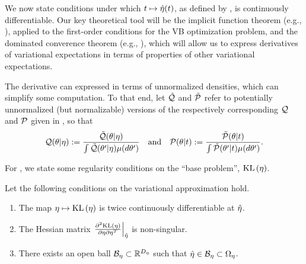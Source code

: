 We now state conditions under which $t \mapsto \hat\eta(t)$, as defined by
, is continuously differentiable.  Our key theoretical tool will
be the implicit function theorem (e.g., \citet{krantz:2012:implicit}), applied
to the first-order conditions for the VB optimization problem, and the dominated
converence theorem (e.g., \citet[Theorem 16.8]{billingsley:1986:probability}),
which will allow us to express derivatives of variational expectations in terms
of properties  of other variational expectations.

The derivative can expressed in terms of unnormalized densities, which can
simplify some computation.  To that end, let $\tilde{\mathcal{Q}}$ and $\tilde{\mathcal{P}}$ refer to
potentially unnormalized (but normalizable) versions of the respectively
corresponding $\mathcal{Q}$ and $\mathcal{P}$ given in , so that
%
\begin{align*}
%
\q(\theta \vert \eta) :={}
    \frac{\qtil(\theta \vert \eta)}
    {\int \qtil(\theta' \vert \eta) \mu(d\theta')} \mathand
\p(\theta \vert \t) :={}
    \frac{\ptil(\theta \vert \t)}
    {\int \ptil(\theta' \vert \t) \mu(d\theta')}.
%
\end{align*}

For , we state some regularity conditions on the ``base
problem'', $\mathrm{KL}\left(\eta\right)$.

\begin{assu}
%
Let the following conditions on the variational approximation hold.
%
\begin{enumerate}
%
    \item {} The map $\eta \mapsto \mathrm{KL}\left(\eta\right)$ is twice
    continuously differentiable at $\hat\eta$.

    \item{} The Hessian matrix $\left.\frac{\partial^2 \mathrm{KL}\left(\eta\right)}{\partial \eta \partial \eta^T}\right\vert_{\hat\eta}$ is non-singular.

    \item {} There exists an open ball
    $\mathcal{B}_\eta \subset \mathbb{R}^{D_{\eta}}$ such that $\hat\eta \in \mathcal{B}_\eta \subset \Omega_{\eta}$.
%
\end{enumerate}
%
\end{assu}

